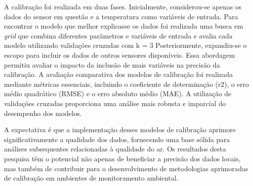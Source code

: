 A calibração foi realizada em duas fases. Inicialmente, considerou-se apenas os dados do sensor em questão e a temperatura como variáveis de entrada. Para encontrar o modelo que melhor explicasse os dados foi realizada uma busca em \textit{grid} que combina diferentes parâmetros e variáveis de entrada e avalia cada modelo utilizando validações cruzadas com k = 3 Posteriormente, expandiu-se o escopo para incluir os dados de outros sensores disponíveis. Essa abordagem permitiu avaliar o impacto da inclusão de mais variáveis na precisão da calibração. A avaliação comparativa dos modelos de calibração foi realizada mediante métricas essenciais, incluindo o coeficiente de determinação (r2), o erro médio quadrático (RMSE) e o erro absoluto médio (MAE). A utilização de validações cruzadas proporciona uma análise mais robusta e imparcial do desempenho dos modelos.

A expectativa é que a implementação desses modelos de calibração aprimore significativamente a qualidade dos dados, fornecendo uma base sólida para análises subsequentes relacionadas à qualidade do ar. Os resultados desta pesquisa têm o potencial não apenas de beneficiar a precisão dos dados locais, mas também de contribuir para o desenvolvimento de metodologias aprimoradas de calibração em ambientes de monitoramento ambiental.